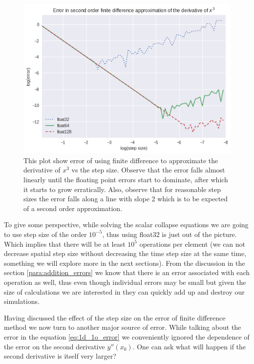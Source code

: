 \begin{figure}[hbt!]
    \centering
    \includegraphics[width=\textwidth]{images/x^3_error_order2.png}
    \caption{This plot show error of using finite difference to approximate the derivative of $x^3$ vs the step size. Observe that the error falls almost linearly until the floating point errors start to dominate, after which it starts to grow erratically. Also, observe that for reasonable step sizes the error falls along a line with slope 2 which is to be expected of a second order approximation. }\label{fig:x^3_error_order2}
\end{figure}


To give some perspective, while solving the scalar collapse equations we are going to use step size of the order $10^{-5}$, thus using float32 is just out of the picture. Which implies that there will be at least $10^{5}$ operations per element (we can not decrease spatial step size without decreasing the time step size at the same time, something we will explore more in the next sections). From the discussion in the section \ref{para:addition_errors} we know that there is an error associated with each operation as well, thus even though individual errors may be small but given the size of calculations we are interested in they can quickly add up and destroy our simulations.





Having discussed the effect of the step size on the error of finite difference method we now turn to another major source of error. While talking about the error in the equation \ref{eq:1d_1o_error} we conveniently ignored the dependence of the error on the second derivative $y''(x_0)$. One can ask what will happen if the second derivative is itself very larger?

